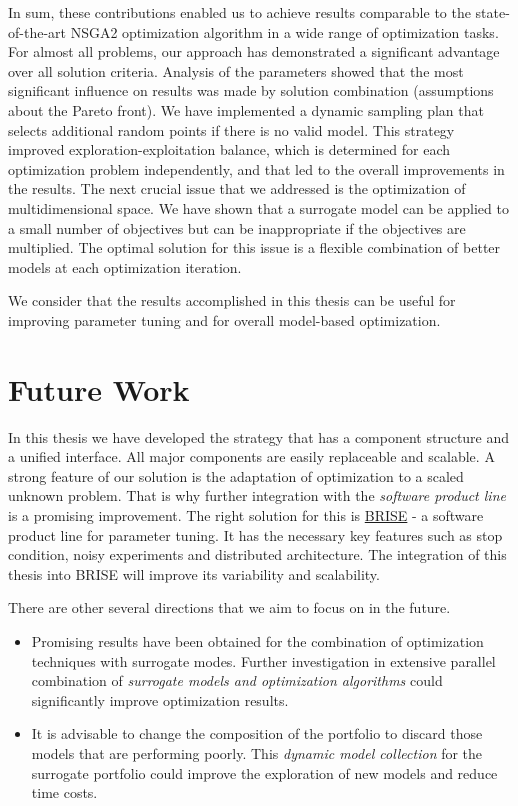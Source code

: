 In sum, these contributions enabled us to achieve results comparable to the state-of-the-art NSGA2 optimization algorithm in a wide range of optimization tasks. For almost all problems, our approach has demonstrated a significant advantage over all solution criteria. Analysis of the parameters showed that the most significant influence on results was made by solution combination (assumptions about the Pareto front). We have implemented a dynamic sampling plan that selects additional random points if there is no valid model. This strategy improved exploration-exploitation balance, which is determined for each optimization problem independently, and that led to the overall improvements in the results.
The next crucial issue that we addressed is the optimization of multidimensional space. We have shown that a surrogate model can be applied to a small number of objectives but can be inappropriate if the objectives are multiplied. The optimal solution for this issue is a flexible combination of better models at each optimization iteration.

We consider that the results accomplished in this thesis can be useful for improving parameter tuning and for overall model-based optimization.

\chapter{Future Work}\label{sec:future_work}

In this thesis we have developed the strategy that has a component structure and a unified interface. All major components are easily replaceable and scalable. A strong feature of our solution is the adaptation of optimization to a scaled unknown problem. That is why further integration with the \emph{software product line} is a promising improvement. The right solution for this is \hyperref[alg:BRISE]{BRISE} - a software product line for parameter tuning. It has the necessary key features such as stop condition, noisy experiments and distributed architecture. The integration of this thesis into BRISE will improve its variability and scalability.

There are other several directions that we aim to focus on in the future.
\begin{itemize}
    \item Promising results have been obtained for the combination of optimization techniques with surrogate modes. Further investigation in extensive parallel combination of \emph{surrogate models and optimization algorithms} could significantly improve optimization results.
    \item It is advisable to change the composition of the portfolio to discard those models that are performing poorly. This \emph{dynamic model collection} for the surrogate portfolio could improve the exploration of new models and reduce time costs.
\end{itemize}
